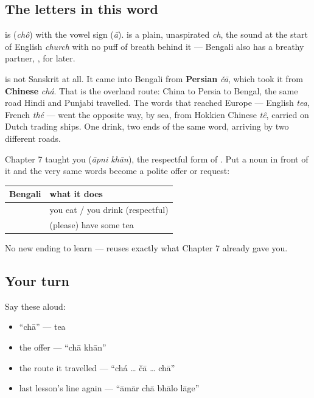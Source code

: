 \subsection*{The letters in this word}
\textbf{} is \textbf{} (\emph{chô}) with the vowel sign \textbf{} (\emph{ā}). \textbf{} is a plain, unaspirated \emph{ch}, the sound at the start of English \emph{church} with no puff of breath behind it — Bengali also has a breathy partner, \textbf{}, for later.

\begin{cousinweb}
\textbf{} is not Sanskrit at all. It came into Bengali from \textbf{Persian} \emph{čā}, which took it from \textbf{Chinese} \emph{chá}. That is the overland route: China to Persia to Bengal, the same road Hindi and Punjabi travelled. The words that reached Europe — English \emph{tea}, French \emph{thé} — went the opposite way, by sea, from Hokkien Chinese \emph{tê}, carried on Dutch trading ships. One drink, two ends of the same word, arriving by two different roads.
\end{cousinweb}

\begin{grammarlens}[title={Grammar Lens: an offer, built on a form you already have}]
Chapter 7 taught you \textbf{ } (\emph{āpni khān}), the respectful form of . Put a noun in front of it and the very same words become a polite offer or request:

\noindent
\begin{tabularx}{\linewidth}{@{}>{\raggedright\arraybackslash}X>{\raggedright\arraybackslash}X@{}}
\toprule
\textbf{Bengali} & \textbf{what it does} \\
\midrule
\bn{আপনি} \bn{খান} & you eat / you drink (respectful) \\
\textbf{\bn{চা} \bn{খান}} & (please) have some tea \\
\bottomrule
\end{tabularx}

No new ending to learn —   reuses exactly what Chapter 7 already gave you.
\end{grammarlens}

\subsection*{Your turn}
Say these aloud:

\begin{itemize}
\raggedright
  \item \textquotedblleft{}chā\textquotedblright{} — tea
  \item the offer — \textquotedblleft{}chā khān\textquotedblright{}
  \item the route it travelled — \textquotedblleft{}chá … čā … chā\textquotedblright{}
  \item last lesson's line again — \textquotedblleft{}āmār chā bhālo lāge\textquotedblright{}
\end{itemize}

